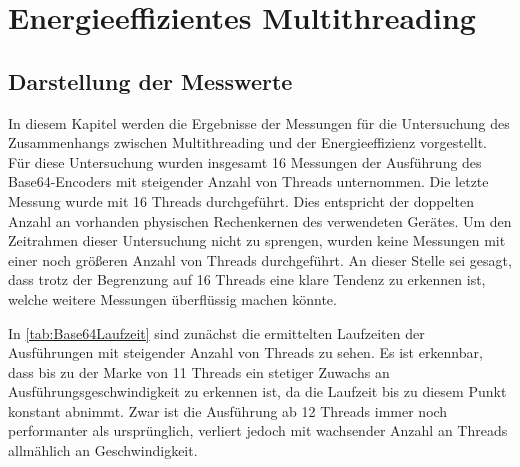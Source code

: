 \chapter{Energieeffizientes Multithreading}

\section{Darstellung der Messwerte}

In diesem Kapitel werden die Ergebnisse der Messungen für die Untersuchung des Zusammenhangs zwischen Multithreading und der Energieeffizienz vorgestellt. Für diese Untersuchung wurden insgesamt 16 Messungen der Ausführung des Base64-Encoders mit steigender Anzahl von Threads unternommen. Die letzte Messung wurde mit 16 Threads durchgeführt. Dies entspricht der doppelten Anzahl an vorhanden physischen Rechenkernen des verwendeten Gerätes. Um den Zeitrahmen dieser Untersuchung nicht zu sprengen, wurden keine Messungen mit einer noch größeren Anzahl von Threads durchgeführt. An dieser Stelle sei gesagt, dass trotz der Begrenzung auf 16 Threads eine klare Tendenz zu erkennen ist, welche weitere Messungen überflüssig machen könnte.

In \autoref{tab:Base64Laufzeit} sind zunächst die ermittelten Laufzeiten der Ausführungen mit steigender Anzahl von Threads zu sehen. Es ist erkennbar, dass bis zu der Marke von 11 Threads ein stetiger Zuwachs an Ausführungsgeschwindigkeit zu erkennen ist, da die Laufzeit bis zu diesem Punkt konstant abnimmt. Zwar ist die Ausführung ab 12 Threads immer noch performanter als ursprünglich, verliert jedoch mit wachsender Anzahl an Threads allmählich an Geschwindigkeit.



